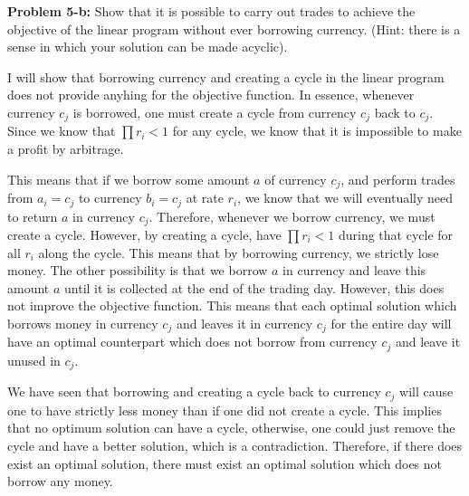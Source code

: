 \documentclass[psamsfonts]{amsart}
\newenvironment{sol}{\vspace{0.25cm}{\large \bfseries Solution:}}{\qedsymbol}
\newenvironment{prob}[1]{\begin{framed}{\large \bfseries Problem #1:}}{\end{framed}}
\begin{document}
\begin{prob}{5-b}
Show that it is possible to carry out trades to achieve the objective of the linear program without ever borrowing currency. (Hint: there is a sense in which your solution can be made acyclic). 
\end{prob}
\begin{sol}
I will show that borrowing currency and creating a cycle in the linear program does not provide anyhing for the objective function. In essence, whenever currency $c_j$ is borrowed, one must create a cycle from currency $c_j$ back to $c_j$. Since we know that $\prod r_i < 1$ for any cycle, we know that it is impossible to make a profit by arbitrage. 

This means that if we borrow some amount $a$ of currency $c_j$, and perform trades from $a_i = c_j$ to currency $b_i = c_j$ at rate $r_i$, we know that we will eventually need to return $a$ in currency $c_j$. Therefore, whenever we borrow currency, we must create a cycle. However, by creating a cycle, have $\prod r_i < 1$ during that cycle for all $r_i$ along the cycle. This means that by borrowing currency, we strictly lose money. The other possibility is that we borrow $a$ in currency and leave this amount $a$ until it is collected at the end of the trading day. However, this does not improve the objective function. This means that each optimal solution which borrows money in currency $c_j$ and leaves it in currency $c_j$ for the entire day will have an optimal counterpart which does not borrow from currency $c_j$ and leave it unused in $c_j$. 

We have seen that borrowing and creating a cycle back to currency $c_j$ will cause one to have strictly less money than if one did not create a cycle. This implies that no optimum solution can have a cycle, otherwise, one could just remove the cycle and have a better solution, which is a contradiction. Therefore, if there does exist an optimal solution, there must exist an optimal solution which does not borrow any money.
\end{sol}
\end{document}
